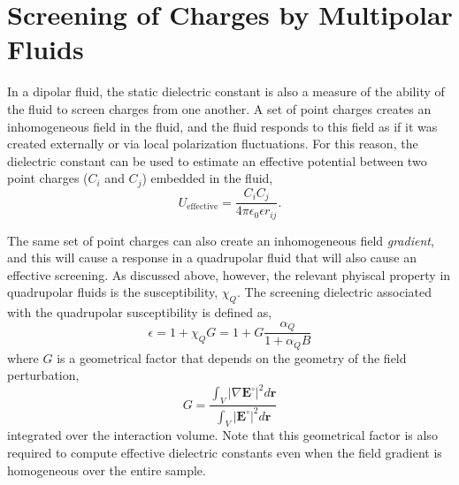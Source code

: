 \section{Screening of Charges by Multipolar Fluids}
\label{sec:PMF}
In a dipolar fluid, the static dielectric constant is also a measure
of the ability of the fluid to screen charges from one another.  A set
of point charges creates an inhomogeneous field in the fluid, and the
fluid responds to this field as if it was created externally or via
local polarization fluctuations. For this reason, the dielectric
constant can be used to estimate an effective potential between two
point charges ($C_i$ and $C_j$) embedded in the fluid,
\begin{equation}
U_\mathrm{effective} = \frac{C_i C_j}{4 \pi \epsilon_0 \epsilon
  r_{ij}}.
\label{eq:effectivePot}
\end{equation}

The same set of point charges can also create an inhomogeneous field
\textit{gradient}, and this will cause a response in a quadrupolar
fluid that will also cause an effective screening. As discussed above,
however, the relevant phyiscal property in quadrupolar fluids is the
susceptibility, $\chi_Q$.  The screening dielectric associated with
the quadrupolar susceptibility is defined as,\cite{Ernst92}
\begin{equation}
\epsilon = 1 + \chi_Q G = 1 + G \frac{\alpha_Q}{1 + \alpha_Q  B}
\label{eq:dielectricFromQuadrupoles}
\end{equation}
where $G$ is a geometrical factor that depends on the geometry of the
field perturbation,
\begin{equation}
G = \frac{\int_V \left| \nabla \mathbf{E}^\circ \right|^2 d\mathbf{r}}
{\int_V \left|\mathbf{E}^\circ\right|^2 d\mathbf{r}}
\end{equation}
integrated over the interaction volume. Note that this geometrical
factor is also required to compute effective dielectric constants even
when the field gradient is homogeneous over the entire sample.

